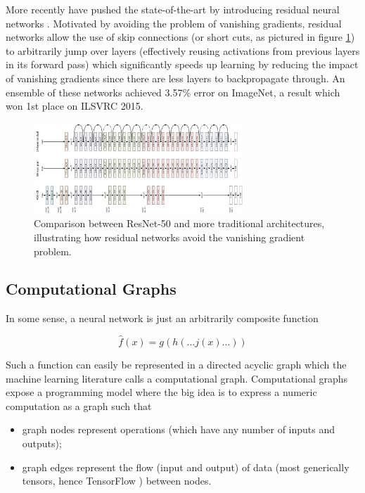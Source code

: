 More recently \citeauthor{resnet} have pushed the state-of-the-art by introducing residual neural networks \cite{resnet}. Motivated by avoiding the problem of vanishing gradients, residual networks allow the use of skip connections (or short cuts, as pictured in figure \ref{fig:resnet50}) to arbitrarily jump over layers (effectively reusing activations from previous layers in its forward pass) which significantly speeds up learning by reducing the impact of vanishing gradients since there are less layers to backpropagate through. An ensemble of these networks achieved 3.57\% error on ImageNet, a result which won 1st place on \ac{ILSVRC} 2015.

\begin{figure}[ht]
    \centering
    \includegraphics[width=0.7\textwidth]{figs/resnet50.png}
    \caption{Comparison between ResNet-50 and more traditional architectures, illustrating how residual networks avoid the vanishing gradient problem.}
    \label{fig:resnet50}
\end{figure}

\subsection{Computational Graphs}

In some sense, a neural network is just an arbitrarily composite function

$$
\hat{f}(x) = g(h( ... j(x) ... ))
$$

Such a function can easily be represented in a directed acyclic graph which the machine learning literature calls a computational graph. Computational graphs expose a programming model where the big idea is to express a numeric computation as a graph such that

\begin{itemize}
    \item graph nodes represent operations (which have any number of inputs and outputs);
    \item graph edges represent the flow (input and output) of data (most generically tensors, hence TensorFlow \cite{tensorflow}) between nodes.
\end{itemize}

